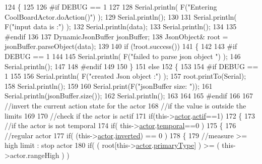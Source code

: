 \begin{DoxyCode}
124 \{
125 
126 \textcolor{preprocessor}{#if DEBUG == 1 }
127 
128     Serial.println( F(\textcolor{stringliteral}{"Entering CoolBoardActor.doAction()"}) );
129     Serial.println();
130 
131     Serial.println( F(\textcolor{stringliteral}{"input data is :"}) );
132     Serial.println(data);
133     Serial.println();
134 
135 \textcolor{preprocessor}{#endif }
136 
137     DynamicJsonBuffer jsonBuffer;
138     JsonObject& root = jsonBuffer.parseObject(data);
139     
140     \textcolor{keywordflow}{if} (!root.success()) 
141     \{
142     
143 \textcolor{preprocessor}{    #if DEBUG == 1 }
144 
145         Serial.println( F(\textcolor{stringliteral}{"failed to parse json object "}) );
146         Serial.println();
147     
148 \textcolor{preprocessor}{    #endif }
149 
150     \}
151     \textcolor{keywordflow}{else}
152     \{
153     
154 \textcolor{preprocessor}{    #if DEBUG == 1 }
155 
156         Serial.println( F(\textcolor{stringliteral}{"created Json object :"}) );
157         root.printTo(Serial);
158         Serial.println();
159 
160         Serial.print(F(\textcolor{stringliteral}{"jsonBuffer size: "}));
161         Serial.println(jsonBuffer.size());
162         Serial.println();
163 
164     
165 \textcolor{preprocessor}{    #endif }
166 
167         \textcolor{comment}{//invert the current action state for the actor}
168         \textcolor{comment}{//if the value is outside the limits}
169         
170         \textcolor{comment}{//check if the actor is actif }
171         \textcolor{keywordflow}{if}(this->\hyperlink{class_cool_board_actor_a8f190db9f7a39fddbcef7f152da970e9}{actor}.\hyperlink{struct_cool_board_actor_1_1state_a7963178c2de01ef0d2861f9f59ad6f3c}{actif}==1)
172         \{                       
173             \textcolor{comment}{//if the actor is not temporal}
174             \textcolor{keywordflow}{if}( this->\hyperlink{class_cool_board_actor_a8f190db9f7a39fddbcef7f152da970e9}{actor}.\hyperlink{struct_cool_board_actor_1_1state_a6442a8c3a30abc48472f3e5284b786ea}{temporal}==0 ) 
175             \{   
176                 \textcolor{comment}{//regular actor}
177                 \textcolor{keywordflow}{if}( (this->\hyperlink{class_cool_board_actor_a8f190db9f7a39fddbcef7f152da970e9}{actor}.\hyperlink{struct_cool_board_actor_1_1state_aa4fdca81973fd7b29541877db1cf27bd}{inverted}) == 0 )
178                 \{
179                     \textcolor{comment}{//measure >= high limit : stop actor}
180                     \textcolor{keywordflow}{if}( ( root[this->\hyperlink{class_cool_board_actor_a8f190db9f7a39fddbcef7f152da970e9}{actor}.\hyperlink{struct_cool_board_actor_1_1state_a8a0b318fd2814cf67fe74ee8164df55e}{primaryType}] ) >= ( this->actor.rangeHigh ) )    

\end{DoxyCode}
